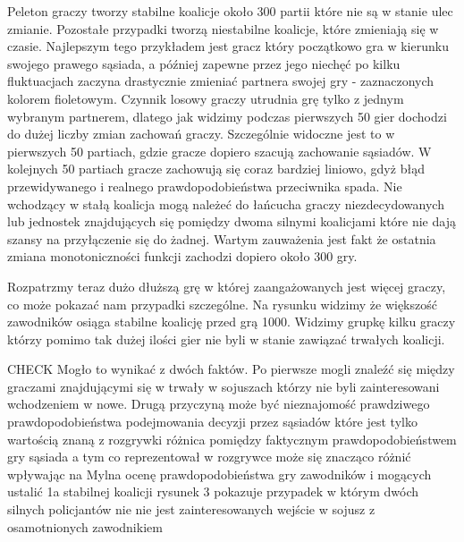 Peleton graczy tworzy stabilne koalicje około 300 partii które nie są w stanie ulec zmianie. Pozostałe przypadki tworzą niestabilne koalicje, które zmieniają się w czasie. Najlepszym tego przykładem jest gracz który początkowo gra w kierunku swojego prawego sąsiada, a później zapewne przez jego niechęć po kilku fluktuacjach zaczyna drastycznie zmieniać partnera swojej gry - zaznaczonych kolorem fioletowym. Czynnik losowy graczy utrudnia grę tylko z jednym wybranym partnerem, dlatego jak widzimy podczas pierwszych 50 gier dochodzi do dużej liczby zmian zachowań graczy. Szczególnie widoczne jest to w pierwszych 50 partiach, gdzie gracze dopiero szacują zachowanie sąsiadów. W kolejnych 50 partiach gracze zachowują się coraz bardziej liniowo, gdyż błąd przewidywanego i realnego prawdopodobieństwa przeciwnika spada. Nie wchodzący w stałą koalicja mogą należeć do łańcucha graczy niezdecydowanych lub jednostek znajdujących się pomiędzy dwoma silnymi koalicjami które nie dają szansy na przyłączenie się do żadnej. Wartym zauważenia jest fakt że ostatnia zmiana monotoniczności funkcji zachodzi dopiero około 300 gry.

Rozpatrzmy teraz dużo dłuższą grę w której zaangażowanych jest więcej graczy, co może pokazać nam przypadki szczególne. Na rysunku widzimy że większość zawodników osiąga stabilne koalicję przed grą 1000. Widzimy grupkę kilku graczy którzy pomimo tak dużej ilości gier nie byli w stanie zawiązać trwałych koalicji.

CHECK
Mogło to wynikać z dwóch faktów. Po pierwsze mogli znaleźć się między graczami znajdującymi się w trwały w sojuszach którzy nie byli zainteresowani wchodzeniem w nowe. Drugą przyczyną może być nieznajomość prawdziwego prawdopodobieństwa podejmowania decyzji przez sąsiadów które jest tylko wartością znaną z rozgrywki różnica pomiędzy faktycznym prawdopodobieństwem gry sąsiada a tym co reprezentował w rozgrywce może się znacząco różnić wpływając na Mylna ocenę prawdopodobieństwa gry zawodników i mogących ustalić 1a stabilnej koalicji rysunek 3 pokazuje przypadek w którym dwóch silnych policjantów nie nie jest zainteresowanych wejście w sojusz z osamotnionych zawodnikiem



